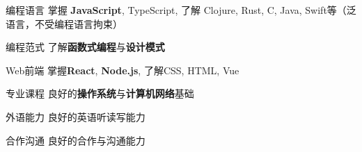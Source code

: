 

\begin{cvskills}

    \cvskill
    {编程语言} %
    {掌握 \textbf{JavaScript}, TypeScript, 了解 Clojure, Rust, C, Java, Swift等（泛语言，不受编程语言拘束）} %

    \cvskill
    {编程范式} %
    {了解\textbf{函数式编程}与\textbf{设计模式}} %

    \cvskill
    {Web前端} %
    {掌握\textbf{React}, \textbf{Node.js}, 了解CSS, HTML, Vue} %

    \cvskill
    {专业课程} %
    {良好的\textbf{操作系统}与\textbf{计算机网络}基础} %

    \cvskill
    {外语能力} %
    {良好的英语听读写能力} %

    \cvskill
    {合作沟通} %
    {良好的合作与沟通能力} %

\end{cvskills}
